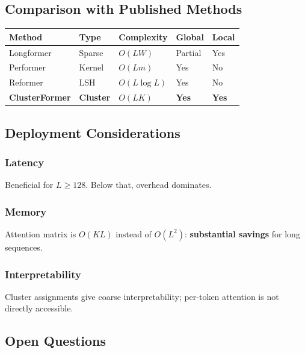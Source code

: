 \subsection{Comparison with Published Methods}

\begin{table}[H]
\centering
\small
\begin{tabular}{lllll}
\toprule
\textbf{Method} & \textbf{Type} & \textbf{Complexity} & \textbf{Global} & \textbf{Local} \\
\midrule
Longformer & Sparse & $O(LW)$ & Partial & Yes \\
Performer & Kernel & $O(Lm)$ & Yes & No \\
Reformer & LSH & $O(L\log L)$ & Yes & No \\
\textbf{ClusterFormer} & \textbf{Cluster} & \textbf{$O(LK)$} & \textbf{Yes} & \textbf{Yes} \\
\bottomrule
\end{tabular}
\end{table}

\subsection{Deployment Considerations}

\subsubsection{Latency}

Beneficial for $L \geq 128$. Below that, overhead dominates.

\subsubsection{Memory}

Attention matrix is $O(KL)$ instead of $O(L^2)$: \textbf{substantial savings} 
for long sequences.

\subsubsection{Interpretability}

Cluster assignments give coarse interpretability; per-token attention is 
not directly accessible.

\subsection{Open Questions}

